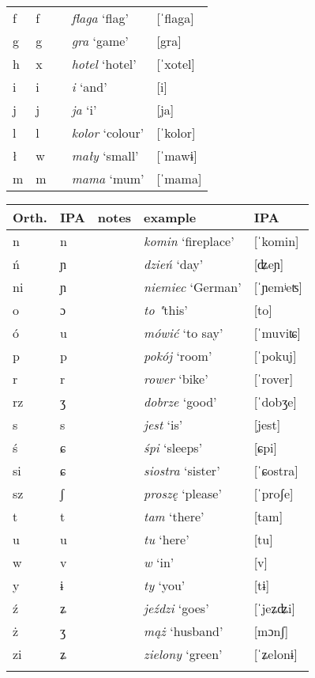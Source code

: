 {\begin{tabularx}{\textwidth}{llXll}
        f & f &  & \textit{flaga} `flag' & [ˈflaga]\\
        g & g &  & \textit{gra} `game' & [gra]\\
        h & x &  & \textit{hotel} `hotel' & [ˈxotel]\\
        i & i &  & \textit{i} `and' & [i]\\
        j & j &  & \textit{ja} `i' & [ja]\\
        l & l &  & \textit{kolor} `colour' & [ˈkolor]\\
        ł & w &  & \textit{mały} `small' & [ˈmawɨ]\\
        m & m &  & \textit{mama} `mum' & [ˈmama]\\
        \midrule
    \end{tabularx}
    \newpage
    \begin{tabularx}{\textwidth}{llXll}
        \lsptoprule
        Orth. & IPA & notes & example & IPA\\
        \midrule
        n & n &  & \textit{komin} `fireplace' & [ˈkomin]\\
        ń & ɲ &  & \textit{dzień} `day' & [ʥeɲ]\\
        ni & ɲ &  & \textit{niemiec} `German' & [ˈɲemʲeʦ]\\
        o & ɔ &   & \textit{to} \textit{"}this' & [to]\\
        ó & u &  & \textit{mówić} `to say' & [ˈmuviʨ]\\
        p & p &  & \textit{pokój} `room' & [ˈpokuj]\\
        r & r &  & \textit{rower} `bike' & [ˈrover]\\
        rz & ʒ &  & \textit{dobrze} `good' & [ˈdobʒe]\\
        s & s &  & \textit{jest} `is' & [jest]\\
        ś & ɕ &  & \textit{śpi} `sleeps' & [ɕpi]\\
        si & ɕ &  & \textit{siostra} `sister' & [ˈɕostra]\\
        sz & ʃ &  & \textit{proszę} `please' & [ˈproʃe]\\
        t & t &  & \textit{tam} `there' & [tam]\\
        u & u &  & \textit{tu} `here' & [tu]\\
        w & v &  & \textit{w} `in' & [v]\\
        y & ɨ &  & \textit{ty} `you' & [tɨ]\\
        ź & ʑ &  & \textit{jeździ} `goes' & [ˈjeʑʥi]\\
        ż & ʒ &  & \textit{mąż} `husband' & [mɔnʃ]\\
        zi & ʑ &  & \textit{zielony} `green' & [ˈʑelonɨ]\\
        \lspbottomrule
    \end{tabularx}
}
